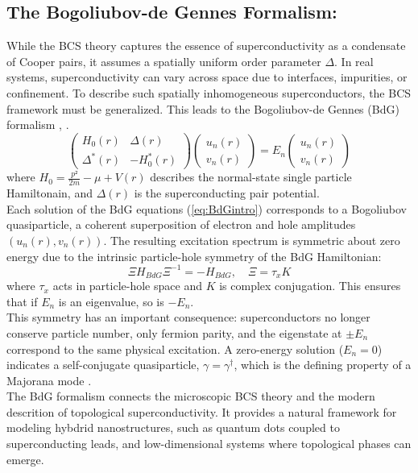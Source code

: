 \documentclass[11pt, letterpaper, titlepage]{article}
\begin{document}
\subsection{The Bogoliubov-de Gennes Formalism:}
While the BCS theory captures the essence of superconductivity as a condensate of Cooper pairs, it assumes a spatially uniform order parameter $Δ$. In real systems, superconductivity can vary across space due to interfaces, impurities, or confinement. To describe such spatially inhomogeneous superconductors, the BCS framework must be generalized. This leads to the Bogoliubov-de Gennes (BdG) formalism \cite{Cambridge_MBPhysics}, \cite{BCS}.\\
\begin{equation}
  \begin{pmatrix}
  H_0(r) & Δ(r) \\
  Δ^{*}(r) & -H_0^{*}(r)
  \end{pmatrix}
  \begin{pmatrix}
  u_n(r) \\
  v_n(r)
  \end{pmatrix}= E_n
  \begin{pmatrix}
  u_n(r) \\
  v_n(r)
  \end{pmatrix}
  \label{eq:BdGintro}
\end{equation}
where $H_0 = \frac{p²}{2m}-μ + V(r)$ describes the normal-state single particle Hamiltonain, and $Δ(r)$ is the superconducting pair potential.\\ 
Each solution of the BdG equations (\ref{eq:BdGintro}) corresponds to a Bogoliubov quasiparticle, a coherent superposition of electron and hole amplitudes $(u_n(r), v_n(r))$. The resulting excitation spectrum is symmetric about zero energy due to the intrinsic particle-hole symmetry of the BdG Hamiltonian:
\begin{equation}
  Ξ H_{BdG} Ξ^{-1} = -H_{BdG}, \quad Ξ = τ_x K
\end{equation}
where $τ_x$ acts in particle-hole space and $K$ is complex conjugation. This ensures that if $E_n$ is an eigenvalue, so is $-E_n$.\\
This symmetry has an important consequence: superconductors no longer conserve particle number, only fermion parity, and the eigenstate at $± E_n$ correspond to the same physical excitation. A zero-energy solution ($E_n = 0$) indicates a self-conjugate quasiparticle, $γ = γ^{†}$, which is the defining property of a Majorana mode \cite{Topocondmat}.\\
The BdG formalism connects the microscopic BCS theory and the modern descrition of topological superconductivity. It provides a natural framework for modeling hybdrid nanostructures, such as quantum dots coupled to superconducting leads, and low-dimensional systems where topological phases can emerge.  \\
\end{document}
